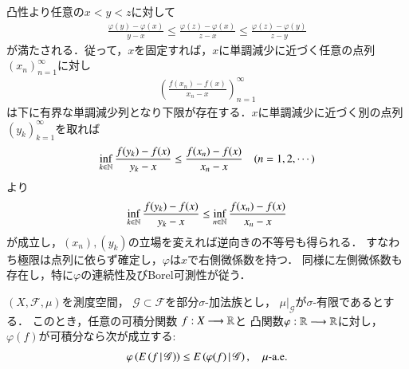 	\begin{prf}
		凸性より任意の$x < y < z$に対して
		\begin{align}
			\frac{\varphi(y) - \varphi(x)}{y - x} 
			\leq \frac{\varphi(z) - \varphi(x)}{z - x}
			\leq \frac{\varphi(z) - \varphi(y)}{z - y}
			\label{ineq:lem:convex_function_measurability_1}
		\end{align}
		が満たされる．従って，$x$を固定すれば，$x$に単調減少に近づく任意の点列$(x_n)_{n=1}^{\infty}$に対し
		 \begin{align}
		 	\left(\frac{f(x_n)-f(x)}{x_n-x}\right)_{n=1}^{\infty} 
		 	\label{seq:lem:convex_function_measurability_2}
		 \end{align}
		 は下に有界な単調減少列となり下限が存在する．$x$に単調減少に近づく別の点列$(y_k)_{k=1}^{\infty}$を取れば
		 \begin{align}
		 	\operatorname*{inf}_{k \in \mathbb{N}} \frac{f(y_k)-f(x)}{y_k-x} \leq \frac{f(x_n)-f(x)}{x_n-x} \quad (n=1,2,\cdots)
		 \end{align}
		 より
		 \begin{align}
		 	\operatorname*{inf}_{k \in \mathbb{N}} \frac{f(y_k)-f(x)}{y_k-x} \leq \operatorname*{inf}_{n \in \mathbb{N}} \frac{f(x_n)-f(x)}{x_n-x}
		 \end{align}
		 が成立し，$(x_n),(y_k)$の立場を変えれば逆向きの不等号も得られる．
		 すなわち極限は点列に依らず確定し，$\varphi$は$x$で右側微係数を持つ．
		 同様に左側微係数も存在し，特に$\varphi$の連続性及びBorel可測性が従う．
		 \QED
	\end{prf}
	
	\begin{screen}
	\begin{thm}[Jensenの不等式]
		$(X,\mathscr{F},\mu)$を測度空間，
		$\mathscr{G} \subset \mathscr{F}$を部分$\sigma$-加法族とし，
		$\left. \mu \right|_{\mathscr{G}}$が$\sigma$-有限であるとする．
		このとき，任意の可積分関数
		$f:X \longrightarrow \mathbb{R}$と
		凸関数$\varphi:\mathbb{R} \longrightarrow \mathbb{R}$に対し，
		$\varphi(f)$が可積分なら次が成立する:
		\begin{align}
			\varphi\left(E\left( f \, \middle|\, \mathscr{G} \right) \right)
			\leq E\left( \varphi(f) \, \middle|\, \mathscr{G} \right),
			\quad \mbox{$\mu$-a.e.}
		\end{align}
	\end{thm}
	\end{screen}
	
